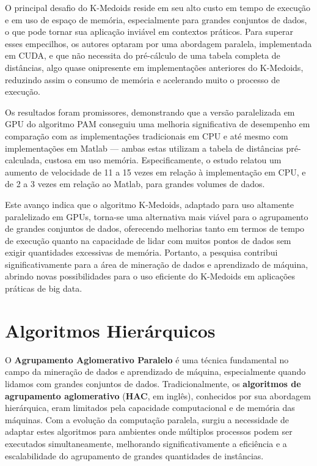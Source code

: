 \documentclass[12pt,
openright, 
oneside, %
a4paper,    %
brazil]{facom-ufu-abntex2}
\begin{document}
O principal desafio do K-Medoids reside em seu alto custo em tempo de execução e em uso de espaço de memória, especialmente para grandes conjuntos de dados, o que pode tornar sua aplicação inviável em contextos práticos. Para superar esses empecilhos, os autores optaram por uma abordagem paralela, implementada em CUDA, e que não necessita do pré-cálculo de uma tabela completa de distâncias, algo quase onipresente em implementações anteriores do K-Medoids, reduzindo assim o consumo de memória e acelerando muito o processo de execução.

Os resultados foram promissores, demonstrando que a versão paralelizada em GPU do algoritmo PAM conseguiu uma melhoria significativa de desempenho em comparação com as implementações tradicionais em CPU e até mesmo com implementações em Matlab --- ambas estas utilizam a tabela de distâncias pré-calculada, custosa em uso memória. Especificamente, o estudo relatou um aumento de velocidade de 11 a 15 vezes em relação à implementação em CPU, e de 2 a 3 vezes em relação ao Matlab, para grandes volumes de dados.

Este avanço indica que o algoritmo K-Medoids, adaptado para uso altamente paralelizado em GPUs, torna-se uma alternativa mais viável para o agrupamento de grandes conjuntos de dados, oferecendo melhorias tanto em termos de tempo de execução quanto na capacidade de lidar com muitos pontos de dados sem exigir quantidades excessivas de memória. Portanto, a pesquisa contribui significativamente para a área de mineração de dados e aprendizado de máquina, abrindo novas possibilidades para o uso eficiente do K-Medoids em aplicações práticas de big data.




\section{Algoritmos Hierárquicos}

O \textbf{Agrupamento Aglomerativo Paralelo} é uma técnica fundamental no campo da mineração de dados e aprendizado de máquina, especialmente quando lidamos com grandes conjuntos de dados. Tradicionalmente, os \textbf{algoritmos de agrupamento aglomerativo} (\textbf{HAC}, em inglês), conhecidos por sua abordagem hierárquica, eram limitados pela capacidade computacional e de memória das máquinas. Com a evolução da computação paralela, surgiu a necessidade de adaptar estes algoritmos para ambientes onde múltiplos processos podem ser executados simultaneamente, melhorando significativamente a eficiência e a escalabilidade do agrupamento de grandes quantidades de instâncias.
\end{document}
